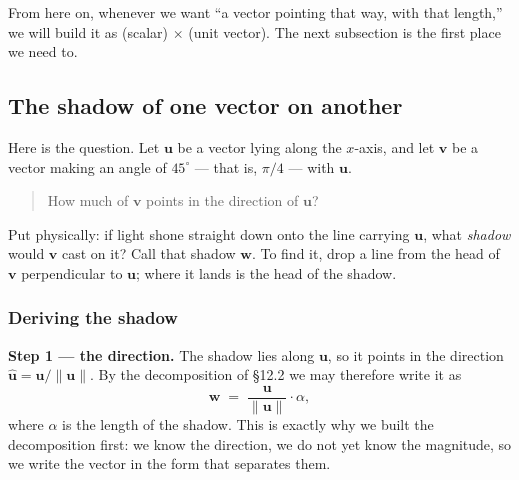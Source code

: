 \documentclass[11pt]{article}
\theoremstyle{definition}
\theoremstyle{remark}
\newcommand{\vc}[1]{\mathbf{#1}}
\newcommand{\norm}[1]{\lVert #1\rVert}
\newcommand{\uv}[1]{\hat{\vc{#1}}}                 %
\newcommand{\lattice}[4]{%
  \draw[step=1cm,gray!25,very thin] (#1,#3) grid (#2,#4);
  \draw[axisline] (#1,0) -- (#2+0.45,0) node[right,font=\scriptsize,black]{$x$};
  \draw[axisline] (0,#3) -- (0,#4+0.45) node[above,font=\scriptsize,black]{$y$};
}
\begin{document}
\noindent From here on, whenever we want ``a vector pointing that way, with that
length,'' we will build it as (scalar)$\,\times\,$(unit vector). The next
subsection is the first place we need to.

\subsection{The shadow of one vector on another}
Here is the question. Let $\vc{u}$ be a vector lying along the $x$-axis, and let
$\vc{v}$ be a vector making an angle of $45^{\circ}$ --- that is, $\pi/4$ ---
with $\vc{u}$.

\begin{quote}
How much of $\vc{v}$ points in the direction of $\vc{u}$?
\end{quote}

\noindent Put physically: if light shone straight down onto the line carrying
$\vc{u}$, what \emph{shadow} would $\vc{v}$ cast on it? Call that shadow
$\vc{w}$. To find it, drop a line from the head of $\vc{v}$ perpendicular to
$\vc{u}$; where it lands is the head of the shadow.

\begin{center}
\end{center}

\subsubsection*{Deriving the shadow}
\textbf{Step 1 --- the direction.} The shadow lies along $\vc{u}$, so it points
in the direction $\uv{u}=\vc{u}/\norm{\vc{u}}$. By the decomposition of \S12.2
we may therefore write it as
\[
  \vc{w} \;=\; \frac{\vc{u}}{\norm{\vc{u}}}\cdot\alpha ,
\]
where $\alpha$ is the length of the shadow. This is exactly why we built the
decomposition first: we know the direction, we do not yet know the magnitude, so
we write the vector in the form that separates them.
\end{document}
